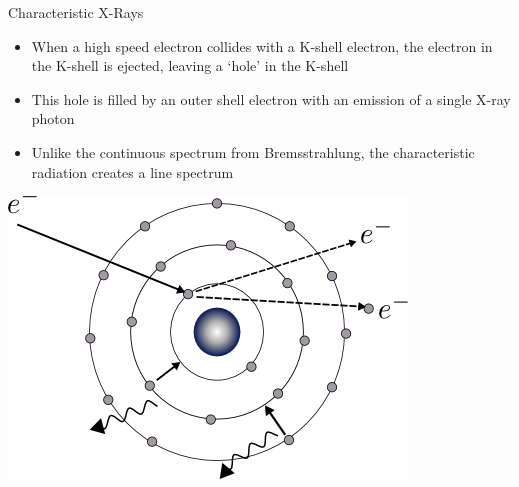 \begin{frame}{Characteristic X-Rays}
    \begin{itemize}
        \item When a high speed electron collides with a K-shell electron, the electron in the K-shell is ejected, leaving a `hole' in the K-shell
        \item This hole is filled by an outer shell electron with an emission of a single X-ray photon
        \item Unlike the continuous spectrum from Bremsstrahlung, the characteristic radiation creates a line spectrum
    \end{itemize}

    \begin{center}\includegraphics[height=0.4\textheight ]{images/characteristic}\end{center}

\end{frame}

